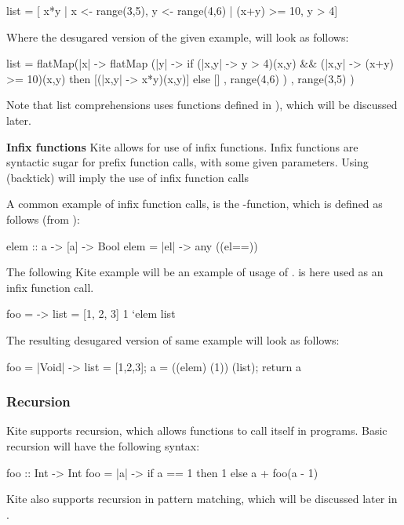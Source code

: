 \begin{kite}
list = [ x*y | x <- range(3,5), y <- range(4,6) | (x+y) >= 10, y > 4]
\end{kite}

Where the desugared version of the given example, will look as follows:

\begin{kite}
list =
flatMap(|x| -> {
  flatMap (|y| -> {
    if (|x,y| -> {y > 4})(x,y) && (|x,y| -> {(x+y) >= 10})(x,y)
       then [(|x,y| -> {x*y})(x,y)]
       else []
  } , range(4,6) )
}, range(3,5) )
\end{kite}

Note that list comprehensions uses functions defined in
), which will be discussed later.

\textbf{Infix functions} Kite allows for use of infix functions. Infix
functions are syntactic sugar for prefix function calls, with some
given parameters. Using  (backtick) will imply the use of
infix function calls

A common example of infix function calls, is the 
-function, which is defined as follows (from ):
\begin{kite}
  elem :: a -> [a] -> Bool
  elem = |el| -> {
    any ((el==))
  }
\end{kite}
The following Kite example will be an example of usage of
.  is here used as an infix function call.
\begin{kite}
  foo =  -> {
    list = [1, 2, 3]
    1 `elem list
  }
\end{kite}
The resulting desugared version of same example will look as follows:

\begin{kite}
  foo = |Void| -> {
    list = [1,2,3];
    a = ((elem) (1)) (list);
    return a
  }
\end{kite}

\subsubsection{Recursion}
Kite supports recursion, which allows functions to call itself in
programs. Basic recursion will have the following syntax:
\begin{kite}
  foo :: Int -> Int
  foo = |a| -> {
    if a == 1 then 1
    else a + foo(a - 1)
  }
\end{kite}
Kite also supports recursion in pattern matching, which will be
discussed later in .

